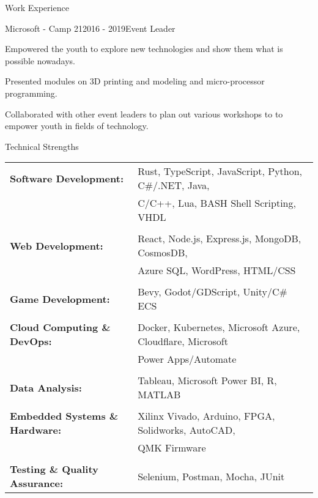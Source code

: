 \documentclass{resume}
\begin{document}
\begin{rSection}{Work Experience}
        \begin{rSubsection}{Microsoft - Camp 21}{2016 - 2019}{Event Leader}{}
            \item Empowered the youth to explore new technologies and show them what is possible nowadays.
            \item Presented modules on 3D printing and modeling and micro-processor programming.
            \item Collaborated with other event leaders to plan out various workshops to to empower youth in fields of technology.
        \end{rSubsection}
    \end{rSection}

    \begin{rSection}{Technical Strengths}
        \begin{tabular}{ @{} >{\bfseries}l @{\hspace{2ex}} l }
        
            Software Development:           & Rust, TypeScript, JavaScript, Python, C\#/.NET, Java, \\ 
                                            & C/C++, Lua, BASH Shell Scripting, VHDL \\\\

            Web Development:                & React, Node.js, Express.js, MongoDB, CosmosDB, \\
                                            & Azure SQL, WordPress, HTML/CSS \\\\

            Game Development:               & Bevy, Godot/GDScript, Unity/C\# ECS \\\\

            Cloud Computing \& DevOps:      & Docker, Kubernetes, Microsoft Azure, Cloudflare, Microsoft \\
                                            & Power Apps/Automate \\\\

            Data Analysis:                  & Tableau, Microsoft Power BI, R, MATLAB \\\\

            Embedded Systems \& Hardware:   & Xilinx Vivado, Arduino, FPGA, Solidworks, AutoCAD, \\
                                            & QMK Firmware \\\\

            Testing \& Quality Assurance:   & Selenium, Postman, Mocha, JUnit

                                            
            
        \end{tabular}
    \end{rSection}
\end{document}
